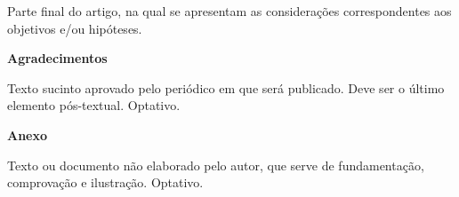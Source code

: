 \documentclass[a4paper, 12pt, oneside] {article}
\begin{document}
\par [OBRIGATÓRIO] Parte final do artigo, na qual se apresentam as considerações correspondentes aos objetivos e/ou hipóteses.
\cite{oxley1992mt}
\singlespacing


\singlespacing

\noindent \textbf{Agradecimentos}

\par Texto sucinto aprovado pelo periódico em que será publicado. Deve ser o último elemento pós-textual. Optativo.
\singlespacing

\noindent\textbf{Anexo}

\par Texto ou documento não elaborado pelo autor, que serve de fundamentação, comprovação e ilustração. Optativo.
\end{document}
